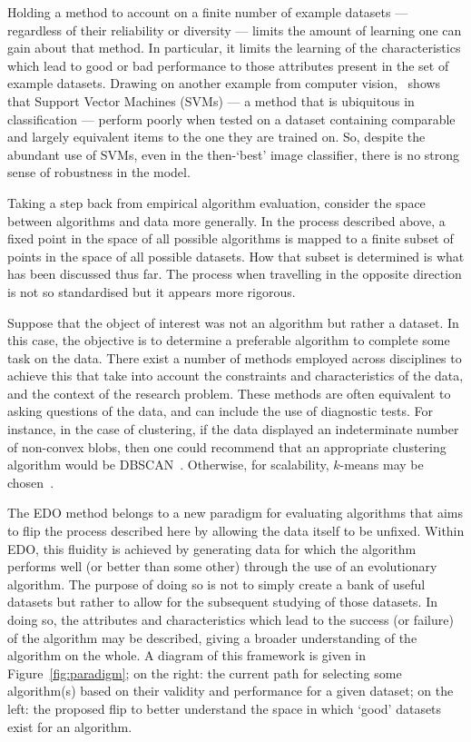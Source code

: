 Holding a method to account on a finite number of example datasets ---
regardless of their reliability or diversity --- limits the amount of learning
one can gain about that method. In particular, it limits the learning of the
characteristics which lead to good or bad performance to those attributes
present in the set of example datasets. Drawing on another example from computer
vision,~\cite{Torralba2011} shows that Support Vector Machines (SVMs) --- a
method that is ubiquitous in classification --- perform poorly when tested on a
dataset containing comparable and largely equivalent items to the one they are
trained on. So, despite the abundant use of SVMs, even in the then-`best' image
classifier, there is no strong sense of robustness in the model.

Taking a step back from empirical algorithm evaluation, consider the space
between algorithms and data more generally. In the process described above,
a fixed point in the space of all possible algorithms is mapped to a finite
subset of points in the space of all possible datasets. How that subset is
determined is what has been discussed thus far. The process when travelling in
the opposite direction is not so standardised but it appears more rigorous.

Suppose that the object of interest was not an algorithm but rather a dataset.
In this case, the objective is to determine a preferable algorithm to complete
some task on the data. There exist a number of methods employed across
disciplines to achieve this that take into account the constraints and
characteristics of the data, and the context of the research problem. These
methods are often equivalent to asking questions of the data, and can include
the use of diagnostic tests. For instance, in the case of clustering, if the
data displayed an indeterminate number of non-convex blobs, then one could
recommend that an appropriate clustering algorithm would be
DBSCAN~\cite{Ester1996}. Otherwise, for scalability, \(k\)-means may be
chosen~\cite{Wu2009,Zhao2009}.

The EDO method belongs to a new paradigm for evaluating algorithms that aims to
flip the process described here by allowing the data itself to be unfixed.
Within EDO, this fluidity is achieved by generating data for which the algorithm
performs well (or better than some other) through the use of an evolutionary
algorithm. The purpose of doing so is not to simply create a bank of useful
datasets but rather to allow for the subsequent studying of those datasets. In
doing so, the attributes and characteristics which lead to the success (or
failure) of the algorithm may be described, giving a broader understanding of
the algorithm on the whole. A diagram of this framework is given in
Figure~\ref{fig:paradigm}; on the right: the current path for selecting some
algorithm(s) based on their validity and performance for a given dataset; on the
left: the proposed flip to better understand the space in which `good' datasets
exist for an algorithm.

